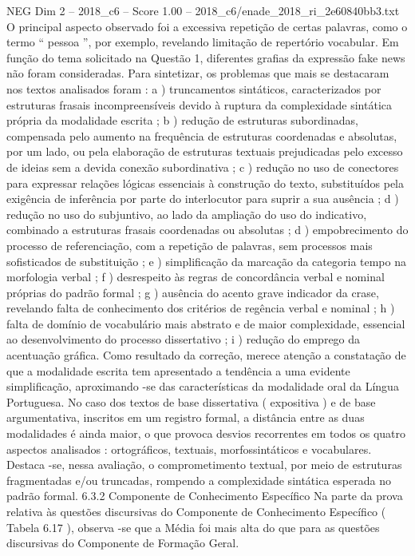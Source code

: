 \begin{textsample}{NEG Dim 2 – 2018\_c6 – Score 1.00 – 2018\_c6/enade\_2018\_ri\_2e60840bb3.txt}
O principal aspecto observado foi a excessiva repetição de certas palavras, como o termo “ pessoa ”, por exemplo, revelando limitação de repertório vocabular.
Em função do tema solicitado na Questão 1, diferentes grafias da expressão fake news não foram consideradas.
Para sintetizar, os problemas que mais se destacaram nos textos analisados foram : a ) truncamentos sintáticos, caracterizados por estruturas frasais incompreensíveis devido à ruptura da complexidade sintática própria da modalidade escrita ; b ) redução de estruturas subordinadas, compensada pelo aumento na frequência de estruturas coordenadas e absolutas, por um lado, ou pela elaboração de estruturas textuais prejudicadas pelo excesso de ideias sem a devida conexão subordinativa ; c ) redução no uso de conectores para expressar relações lógicas essenciais à construção do texto, substituídos pela exigência de inferência por parte do interlocutor para suprir a sua ausência ; d ) redução no uso do subjuntivo, ao lado da ampliação do uso do indicativo, combinado a estruturas frasais coordenadas ou absolutas ; d ) empobrecimento do processo de referenciação, com a repetição de palavras, sem processos mais sofisticados de substituição ; e ) simplificação da marcação da categoria tempo na morfologia verbal ; f ) desrespeito às regras de concordância verbal e nominal próprias do padrão formal ; g ) ausência do acento grave indicador da crase, revelando falta de conhecimento dos critérios de regência verbal e nominal ; h ) falta de domínio de vocabulário mais abstrato e de maior complexidade, essencial ao desenvolvimento do processo dissertativo ; i ) redução do emprego da acentuação gráfica.
Como resultado da correção, merece atenção a constatação de que a modalidade escrita tem apresentado a tendência a uma evidente simplificação, aproximando -se das características da modalidade oral da Língua Portuguesa.
No caso dos textos de base dissertativa ( expositiva ) e de base argumentativa, inscritos em um registro formal, a distância entre as duas modalidades é ainda maior, o que provoca desvios recorrentes em todos os quatro aspectos analisados : ortográficos, textuais, morfossintáticos e vocabulares.
Destaca -se, nessa avaliação, o comprometimento textual, por meio de estruturas fragmentadas e/ou truncadas, rompendo a complexidade sintática esperada no padrão formal. 6.3.2 Componente de Conhecimento Específico Na parte da prova relativa às questões discursivas do Componente de Conhecimento Específico ( Tabela 6.17 ), observa -se que a Média foi mais alta do que para as questões discursivas do Componente de Formação Geral.

\end{textsample}
